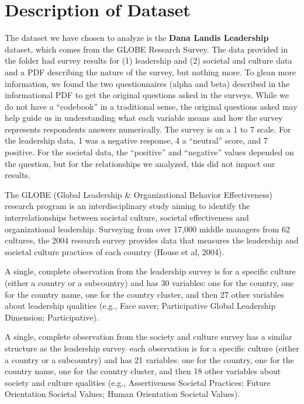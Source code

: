 \documentclass[
]{article}
\begin{document}
\hypertarget{description-of-dataset}{%
\section{Description of Dataset}\label{description-of-dataset}}

The dataset we have chosen to analyze is the \textbf{Dana Landis
Leadership} dataset, which comes from the GLOBE Research Survey. The
data provided in the folder had survey results for (1) leadership and
(2) societal and culture data and a PDF describing the nature of the
survey, but nothing more. To glean more information, we found the two
questionnaires (alpha and beta) described in the informational PDF to
get the original questions asked in the surveys. While we do not have a
``codebook'' in a traditional sense, the original questions asked may
help guide us in understanding what each variable means and how the
survey represents respondents answers numerically. The survey is on a 1
to 7 scale. For the leadership data, 1 was a negative response, 4 a
``neutral'' score, and 7 positive. For the societal data, the
``positive'' and ``negative'' values depended on the question, but for
the relationships we analyzed, this did not impact our results.

The GLOBE (Global Leadership \& Organizational Behavior Effectiveness)
research program is an interdisciplinary study aiming to identify the
interrelationships between societal culture, societal effectiveness and
organizational leadership. Surveying from over 17,000 middle managers
from 62 cultures, the 2004 research survey provides data that measures
the leadership and societal culture practices of each country (House et
al, 2004).

A single, complete observation from the leadership survey is for a
specific culture (either a country or a subcountry) and has 30
variables: one for the country, one for the country name, one for the
country cluster, and then 27 other variables about leadership qualities
(e.g., Face saver; Participative Global Leadership Dimension;
Participative).

A single, complete observation from the society and culture survey has a
similar structure as the leadership survey--each observation is for a
specific culture (either a country or a subcountry) and has 21
variables: one for the country, one for the country name, one for the
country cluster, and then 18 other variables about society and culture
qualities (e.g., Assertiveness Societal Practices; Future Orientation
Societal Values; Human Orientation Societal Values).
\end{document}
